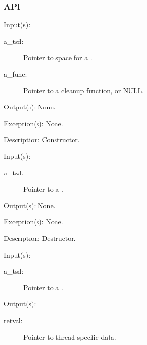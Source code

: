 \subsubsection{API}
\begin{capi}
\label{tsd_new}
	\begin{capilist}
	\item[Input(s): ]
		\begin{description}\item[]
		\item[a\_tsd: ]
			Pointer to space for a .
		\item[a\_func: ]
			Pointer to a cleanup function, or NULL.
		\end{description}
	\item[Output(s): ] None.
	\item[Exception(s): ] None.
	\item[Description: ]
		Constructor.
	\end{capilist}
\label{tsd_delete}
	\begin{capilist}
	\item[Input(s): ]
		\begin{description}\item[]
		\item[a\_tsd: ]
			Pointer to a \classname{tsd}.
		\end{description}
	\item[Output(s): ] None.
	\item[Exception(s): ] None.
	\item[Description: ]
		Destructor.
	\end{capilist}
\label{tsd_get}
	\begin{capilist}
	\item[Input(s): ]
		\begin{description}\item[]
		\item[a\_tsd: ]
			Pointer to a .
		\end{description}
	\item[Output(s): ]
		\begin{description}\item[]
		\item[retval: ]
			Pointer to thread-specific data.
		\end{description}

\end{capilist}
\end{capi}
